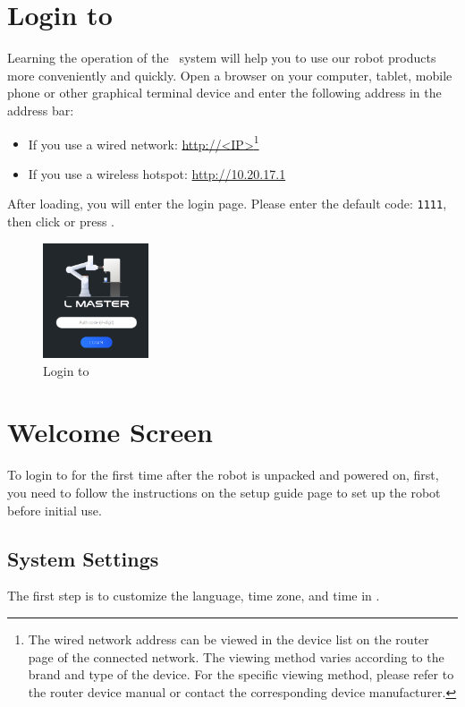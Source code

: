 
\section{Login to \LM}
Learning the operation of the \LM\ system will help you to use our robot products more conveniently and quickly. 
Open a browser on your computer, tablet, mobile phone or other graphical terminal device and enter the following address in the address bar:
\begin{itemize}
	\item If you use a wired network: \url{http://<IP>}\footnote{The wired network address can be viewed in the device list on the router page of the connected network. The viewing method varies according to the brand and type of the device. For the specific viewing method, please refer to the router device manual or contact the corresponding device manufacturer.}
	\item If you use a wireless hotspot: \url{http://10.20.17.1}
\end{itemize}

After loading, you will enter the login page. Please enter the default code: \verb|1111|, then click  or press .

\begin{figure}[ht]
    \centering
    \includegraphics[height=3.4cm]{en/image/2-4.png}
    \caption{Login to \LM}
    \label{fig:登录LM}
\end{figure}

\clearpage

\section{Welcome Screen}

To login to \LM for the first time after the robot is unpacked and powered on, first, you need to follow the instructions on the setup guide page to set up the robot before initial use.
\subsection{System Settings}
The first step is to customize the language, time zone, and time in .

